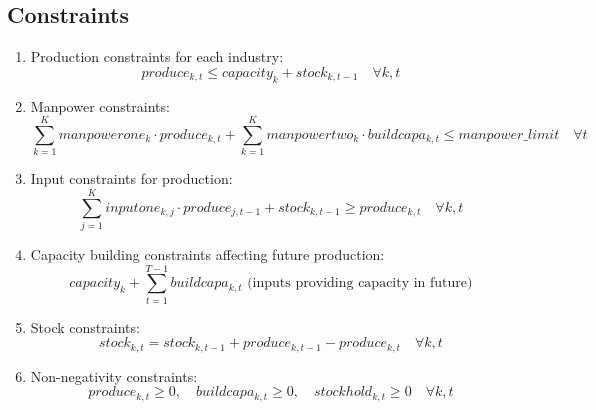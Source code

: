 \documentclass{article}
\begin{document}
\subsection*{Constraints}
\begin{enumerate}
    \item Production constraints for each industry:
    \[
    produce_{k, t} \leq capacity_{k} + stock_{k, t-1} \quad \forall k, t
    \]

    \item Manpower constraints:
    \[
    \sum_{k=1}^{K} manpowerone_{k} \cdot produce_{k, t} + \sum_{k=1}^{K} manpowertwo_{k} \cdot buildcapa_{k, t} \leq manpower\_limit \quad \forall t
    \]

    \item Input constraints for production:
    \[
    \sum_{j=1}^{K} inputone_{k, j} \cdot produce_{j, t-1} + stock_{k, t-1} \geq produce_{k, t} \quad \forall k, t
    \]

    \item Capacity building constraints affecting future production:
    \[
    capacity_{k} + \sum_{t=1}^{T-1} buildcapa_{k, t} \text{ (inputs providing capacity in future)}
    \]

    \item Stock constraints:
    \[
    stock_{k, t} = stock_{k, t-1} + produce_{k, t-1} - produce_{k, t} \quad \forall k, t
    \]

    \item Non-negativity constraints:
    \[
    produce_{k, t} \geq 0, \quad buildcapa_{k, t} \geq 0, \quad stockhold_{k, t} \geq 0 \quad \forall k, t
    \]
\end{enumerate}
\end{document}
